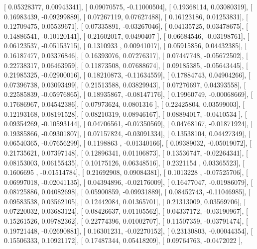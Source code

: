\documentclass{article}
\begin{document}
       [ 0.05328377,  0.00943341],
       [ 0.09070575, -0.11000504],
       [ 0.19368114,  0.03080319],
       [ 0.16983439, -0.09299889],
       [ 0.07267119,  0.07627488],
       [ 0.16123186,  0.01253831],
       [ 0.12709475,  0.05539671],
       [ 0.07335891, -0.03267046],
       [ 0.04135725,  0.03478675],
       [ 0.14886541, -0.10120141],
       [ 0.21602017,  0.0490407 ],
       [ 0.06684546, -0.03198761],
       [ 0.06123537, -0.05153715],
       [ 0.1310933 ,  0.00941017],
       [ 0.05915856,  0.04432385],
       [ 0.16187477,  0.03376846],
       [ 0.16393076,  0.07276317],
       [ 0.07447748, -0.05672502],
       [ 0.22738317,  0.06463959],
       [ 0.11873508,  0.07688674],
       [ 0.09185385, -0.05643445],
       [ 0.21985325, -0.02900016],
       [ 0.18210873, -0.11634559],
       [ 0.17884743,  0.04904266],
       [ 0.07396738,  0.03093499],
       [ 0.21513588,  0.03829943],
       [ 0.07276697,  0.04393558],
       [ 0.22585839, -0.05976865],
       [ 0.18935867, -0.08147176],
       [ 0.19960749, -0.00068669],
       [ 0.17686967,  0.04542386],
       [ 0.07973624,  0.0801316 ],
       [ 0.22425804,  0.03599003],
       [ 0.12193168,  0.08191528],
       [ 0.08210319,  0.08946167],
       [ 0.08894017, -0.0410534 ],
       [ 0.09354269, -0.10593144],
       [ 0.04706561, -0.07350569],
       [ 0.04768167, -0.01871924],
       [ 0.19385866, -0.09301807],
       [ 0.07157824, -0.03091334],
       [ 0.13538104,  0.04427349],
       [ 0.06540365, -0.07656299],
       [ 0.1198863 , -0.01340166],
       [ 0.09389032, -0.05019072],
       [ 0.21735621,  0.07397148],
       [ 0.12896341,  0.01106873],
       [ 0.13536747, -0.02264341],
       [ 0.08153003,  0.06155435],
       [ 0.10175126,  0.06348516],
       [ 0.2321154 ,  0.03365523],
       [ 0.1606695 , -0.01514784],
       [ 0.21692908,  0.09084381],
       [ 0.1013228 , -0.07525706],
       [ 0.06997018, -0.02041135],
       [ 0.04394896, -0.02176009],
       [ 0.16477047, -0.01986079],
       [ 0.08725886,  0.04082698],
       [ 0.05900859, -0.09931889],
       [ 0.08452743, -0.11046985],
       [ 0.09583538,  0.03562105],
       [ 0.12442084,  0.01365701],
       [ 0.21313009,  0.03569706],
       [ 0.07220032,  0.03683124],
       [ 0.08426637,  0.01105562],
       [ 0.04337172, -0.03190967],
       [ 0.15261526,  0.09782362],
       [ 0.22774396,  0.01002707],
       [ 0.11507359, -0.03791474],
       [ 0.19721448, -0.02690881],
       [ 0.16301231, -0.02270152],
       [ 0.23130803, -0.00044354],
       [ 0.15506333,  0.10921172],
       [ 0.17487344,  0.05418209],
       [ 0.09764763, -0.0472022 ],
\end{document}
